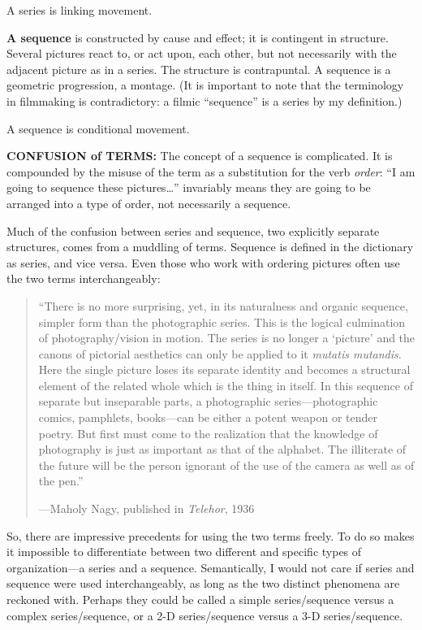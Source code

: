 \documentclass[12pt]{extarticle}
\begin{document}
A series is linking movement.

\textbf{A sequence} is constructed by cause and effect; it is contingent in structure. Several pictures react to, or act upon, each other, but not necessarily with the adjacent picture as in a series. The structure is contrapuntal. A sequence is a geometric progression, a montage. (It is important to note that the terminology in filmmaking is contradictory: a filmic ``sequence'' is a series by my definition.)

A sequence is conditional movement.

\textbf{CONFUSION of TERMS:} The concept of a sequence is complicated. It is compounded by the misuse of the term as a substitution for the verb \textit{order}: ``I am going to sequence these pictures\ldots'' invariably means they are going to be arranged into a type of order, not necessarily a sequence.

Much of the confusion between series and sequence, two explicitly separate structures, comes from a muddling of terms. Sequence is defined in the dictionary as series, and vice versa. Even those who work with ordering pictures often use the two terms interchangeably:

\begin{quote}
``There is no more surprising, yet, in its naturalness and organic sequence, simpler form than the photographic series. This is the logical culmination of photography/vision in motion. The series is no longer a `picture' and the canons of pictorial aesthetics can only be applied to it \textit{mutatis mutandis}. Here the single picture loses its separate identity and becomes a structural element of the related whole which is the thing in itself. In this sequence of separate but inseparable parts, a photographic series---photographic comics, pamphlets, books---can be either a potent weapon or tender poetry. But first must come to the realization that the knowledge of photography is just as important as that of the alphabet. The illiterate of the future will be the person ignorant of the use of the camera as well as of the pen.''

---Maholy Nagy, published in \textit{Telehor}, 1936
\end{quote}

So, there are impressive precedents for using the two terms freely. To do so makes it impossible to differentiate between two different and specific types of organization---a series and a sequence. Semantically, I would not care if series and sequence were used interchangeably, as long as the two distinct phenomena are reckoned with. Perhaps they could be called a simple series/sequence versus a complex series/sequence, or a 2-D series/sequence versus a 3-D series/sequence.
\end{document}

